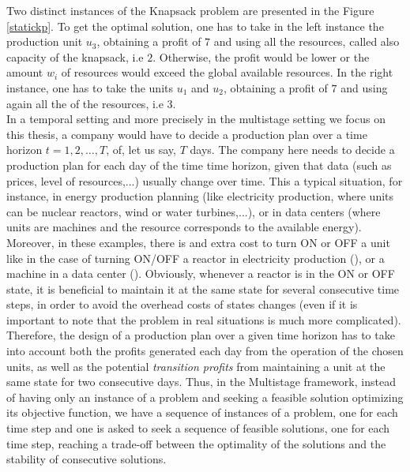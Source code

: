 \documentclass[a4paper]{book}
\begin{document}
Two distinct instances of the {\sc Knapsack} problem are presented in the Figure \ref{statickp}. To get the optimal solution, one has to take in the left instance the production unit $u_3$, obtaining a profit of $7$ and using all the resources, called also capacity of the knapsack, i.e $2$. Otherwise, the profit would be lower or the amount $w_i$ of resources would exceed the global available resources. In the right instance, one has to take the units $u_1$ and $u_2$, obtaining a profit of $7$ and using again all the of the resources, i.e $3$.\\

In a temporal setting and more precisely in the multistage setting we focus on this thesis, a company would have to decide a production plan over a time horizon $t=1,2,\ldots, T$, of, let us say, $T$ days. The company here needs to decide a production plan for each day of the time time horizon, given that data (such as prices, level of resources,...) usually change over time. This a typical situation, for instance, in energy production planning (like electricity production, where units can be nuclear reactors, wind or water turbines,...), or in data centers (where units are machines and the resource corresponds to the available energy). Moreover, in these examples, there is and extra cost to turn ON or OFF a unit like in the case of turning ON/OFF a reactor in electricity production (\cite{rottner2018combinatorial}), or a machine in a data center (\cite{DBLP:conf/spaa/2017}). Obviously, whenever a reactor is in the ON or OFF state, it is beneficial to maintain it at the same state for several consecutive time steps, in order to avoid the overhead costs of states changes (even if it is important to note that the problem in real situations is much more complicated). Therefore, the design of a production plan over a given time horizon has to take into account both the profits generated each day from the operation of the chosen units, as well as the potential \textit{transition profits} from maintaining a unit at the same state for two consecutive days. Thus, in the {\sc Multistage} framework, instead of having only an instance of a problem and seeking a feasible solution optimizing its objective function, we have a sequence of instances of a problem, one for each time step and one is asked to seek a sequence of feasible solutions, one for each time step, reaching a trade-off between the optimality of the solutions and the stability of consecutive solutions.\\
\end{document}
